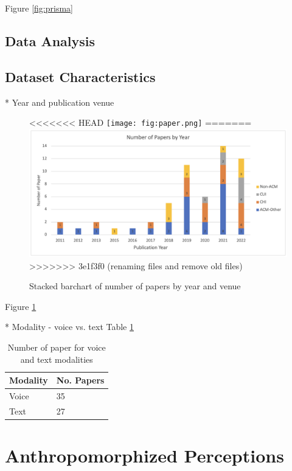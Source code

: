 \documentclass[sigconf,screen,review, anonymous]{acmart}
\begin{document}
Figure \ref{fig:prisma}

\subsection{Data Analysis}



\subsection{Dataset Characteristics}

* Year and publication venue

\begin{figure}[h]
  \centering
<<<<<<< HEAD
  \texttt{[image: fig:paper.png]}
=======
  \includegraphics[width=\textwidth]{fig-paper.png}
>>>>>>> 3e1f3f0 (renaming files and remove old files)
  \caption{Stacked barchart of number of papers by year and venue}
  \label{fig:paper}
\end{figure}

Figure \ref{fig:paper}


\newline
* Modality - voice vs. text Table \ref{tab:modality}

\begin{table}[]
\begin{tabular}{@{}ll@{}}
\toprule
\textbf{Modality} & \textbf{No. Papers} \\ \midrule
Voice             & 35                  \\
Text              & 27                  \\ \bottomrule
\end{tabular}%
\caption{Number of paper for voice and text modalities}
\label{tab:modality}
\end{table}

\section{Anthropomorphized Perceptions}
\end{document}
